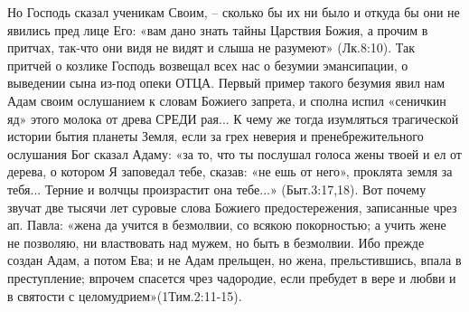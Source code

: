       Но Господь сказал ученикам Своим, – сколько бы их ни было и откуда бы они не явились пред лице Его: «вам дано знать тайны Царствия Божия, а прочим в притчах, так-что они видя не видят и слыша не разумеют» (Лк.8:10). Так притчей о козлике Господь возвещал всех нас о безумии эмансипации, о выведении сына из-под опеки ОТЦА. Первый пример такого безумия явил нам Адам своим ослушанием к словам Божиего запрета, и сполна испил «сеничкин яд» этого молока от древа  СРЕДИ  рая...
      К чему же тогда изумляться трагической истории бытия планеты Земля, если за грех неверия и пренебрежительного ослушания Бог сказал Адаму: «за то, что ты послушал голоса жены твоей и ел от дерева, о котором Я заповедал тебе, сказав:  «не ешь от него»,  проклята земля за тебя... Терние и волчцы произрастит она тебе...» (Быт.3:17,18).  Вот почему звучат две тысячи лет суровые слова Божиего предостережения, записанные чрез ап. Павла: «жена да учится в безмолвии, со всякою покорностью; а учить жене не позволяю, ни властвовать над мужем, но быть в безмолвии. Ибо прежде создан Адам, а потом Ева; и не Адам прельщен, но жена, прельстившись, впала в преступление; впрочем спасется чрез чадородие, если пребудет в вере и любви и в святости с целомудрием»(1Тим.2:11-15).

